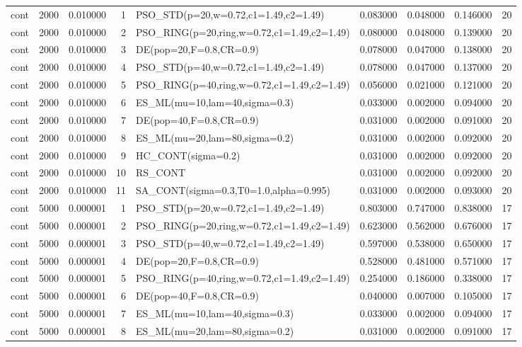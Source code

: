 \begin{longtable}{lrrrlrrrr}
cont & 2000 & 0.010000 & 1 & PSO\_STD(p=20,w=0.72,c1=1.49,c2=1.49) & 0.083000 & 0.048000 & 0.146000 & 20 \\
cont & 2000 & 0.010000 & 2 & PSO\_RING(p=20,ring,w=0.72,c1=1.49,c2=1.49) & 0.080000 & 0.048000 & 0.139000 & 20 \\
cont & 2000 & 0.010000 & 3 & DE(pop=20,F=0.8,CR=0.9) & 0.078000 & 0.047000 & 0.138000 & 20 \\
cont & 2000 & 0.010000 & 4 & PSO\_STD(p=40,w=0.72,c1=1.49,c2=1.49) & 0.078000 & 0.047000 & 0.137000 & 20 \\
cont & 2000 & 0.010000 & 5 & PSO\_RING(p=40,ring,w=0.72,c1=1.49,c2=1.49) & 0.056000 & 0.021000 & 0.121000 & 20 \\
cont & 2000 & 0.010000 & 6 & ES\_ML(mu=10,lam=40,sigma=0.3) & 0.033000 & 0.002000 & 0.094000 & 20 \\
cont & 2000 & 0.010000 & 7 & DE(pop=40,F=0.8,CR=0.9) & 0.031000 & 0.002000 & 0.091000 & 20 \\
cont & 2000 & 0.010000 & 8 & ES\_ML(mu=20,lam=80,sigma=0.2) & 0.031000 & 0.002000 & 0.092000 & 20 \\
cont & 2000 & 0.010000 & 9 & HC\_CONT(sigma=0.2) & 0.031000 & 0.002000 & 0.092000 & 20 \\
cont & 2000 & 0.010000 & 10 & RS\_CONT & 0.031000 & 0.002000 & 0.092000 & 20 \\
cont & 2000 & 0.010000 & 11 & SA\_CONT(sigma=0.3,T0=1.0,alpha=0.995) & 0.031000 & 0.002000 & 0.093000 & 20 \\
cont & 5000 & 0.000001 & 1 & PSO\_STD(p=20,w=0.72,c1=1.49,c2=1.49) & 0.803000 & 0.747000 & 0.838000 & 17 \\
cont & 5000 & 0.000001 & 2 & PSO\_RING(p=20,ring,w=0.72,c1=1.49,c2=1.49) & 0.623000 & 0.562000 & 0.676000 & 17 \\
cont & 5000 & 0.000001 & 3 & PSO\_STD(p=40,w=0.72,c1=1.49,c2=1.49) & 0.597000 & 0.538000 & 0.650000 & 17 \\
cont & 5000 & 0.000001 & 4 & DE(pop=20,F=0.8,CR=0.9) & 0.528000 & 0.481000 & 0.571000 & 17 \\
cont & 5000 & 0.000001 & 5 & PSO\_RING(p=40,ring,w=0.72,c1=1.49,c2=1.49) & 0.254000 & 0.186000 & 0.338000 & 17 \\
cont & 5000 & 0.000001 & 6 & DE(pop=40,F=0.8,CR=0.9) & 0.040000 & 0.007000 & 0.105000 & 17 \\
cont & 5000 & 0.000001 & 7 & ES\_ML(mu=10,lam=40,sigma=0.3) & 0.033000 & 0.002000 & 0.094000 & 17 \\
cont & 5000 & 0.000001 & 8 & ES\_ML(mu=20,lam=80,sigma=0.2) & 0.031000 & 0.002000 & 0.091000 & 17 \\

\end{longtable}
